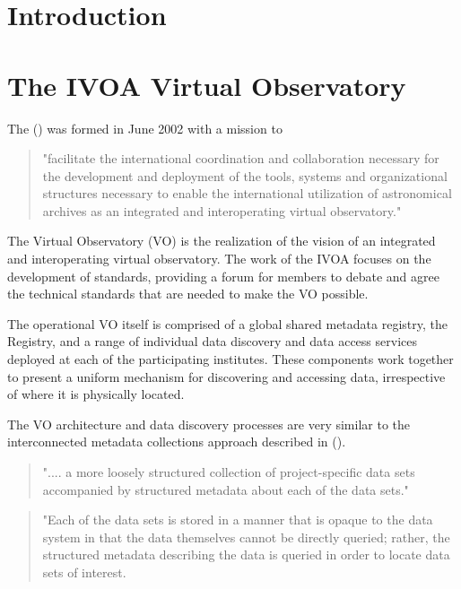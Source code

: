 \documentclass{article}
\begin{document}
\section{Introduction}

\section{The IVOA Virtual Observatory}

The  (\cite{ivoa}) was formed in June 2002 with a mission to
\begin{quote}
"facilitate the international coordination and collaboration
necessary for the development and deployment of the tools, systems and
organizational structures necessary to enable the international utilization of
astronomical archives as an integrated and interoperating virtual observatory."
\end{quote}

The Virtual Observatory (VO) is the realization of the \cite{ivoa} vision of
an integrated and interoperating virtual observatory.
The work of the IVOA focuses on the development of standards, providing a forum
for members to debate and agree the technical standards that are needed to make
the VO possible.

The operational VO itself is comprised of a global shared metadata registry,
the Registry, and a range of individual data discovery and data access services
deployed at each of the participating institutes.
These components work together to present a uniform mechanism for discovering
and accessing data, irrespective of where it is physically located.

The VO architecture and data discovery processes are very similar to the
interconnected metadata collections approach described in
 (\cite{jones-2006}).

\begin{quote}
".... a more loosely structured collection of project-specific data sets
accompanied by structured metadata about each of the data sets."
\end{quote}

\begin{quote}
"Each of the data sets is stored in a manner that is opaque to the data system in
that the data themselves cannot be directly queried; rather, the structured
metadata describing the data is queried in order to locate data sets of
interest.
\end{quote}
\end{document}

